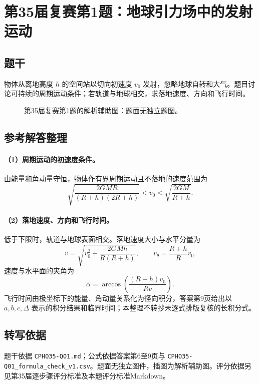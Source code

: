 \section{第35届复赛第1题：地球引力场中的发射运动}
\subsection{题干}
物体从离地高度 $h$ 的空间站以切向初速度 $v_0$ 发射，忽略地球自转和大气。题目讨论可持续的周期运动条件；若轨道与地球相交，求落地速度、方向和飞行时间。
\begin{figure}[htbp]\centering\caption{第35届复赛第1题的解析辅助图：题面无独立题图。}\end{figure}
\subsection{参考解答整理}
\paragraph{（1）周期运动的初速度条件。}
由能量和角动量守恒，物体作有界周期运动且不落地的速度范围为
\[\sqrt{\frac{2GMR}{(R+h)(2R+h)}}<v_0<\sqrt{\frac{2GM}{R+h}}.\]
\paragraph{（2）落地速度、方向和飞行时间。}
低于下限时，轨道与地球表面相交。落地速度大小与水平分量为
\[v=\sqrt{v_0^2+\frac{2GMh}{R(R+h)}},\qquad v_\theta=\frac{R+h}{R}v_0.\]
速度与水平面的夹角为
\[\alpha=\arccos\left(\frac{(R+h)v_0}{Rv}\right).\]
飞行时间由极坐标下的能量、角动量关系化为径向积分，答案第9页给出以 $a,b,c,\Delta$ 表示的积分结果和临界时间；本整理不转抄未逐式排版复核的长积分式。
\subsection{转写依据}
题干依据 \texttt{CPHO35-Q01.md}；公式依据答案第6至9页与 \texttt{CPHO35-Q01\_formula\_check\_v1.csv}。题面无独立图件，插图为解析辅助图。评分依据另见第35届逐步骤评分标准及本题评分标准Markdown。
